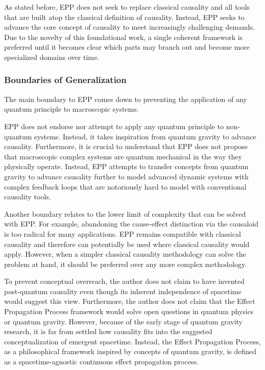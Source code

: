 As stated before, EPP does not seek to replace classical causality and all tools that are built atop the classical
definition of causality. Instead, EPP seeks to advance the core concept of causality to meet increasingly challenging
demands. Due to the novelty of this foundational work, a single coherent framework is preferred until it becomes clear
which parts may branch out and become more specialized domains over time.

\newpage

\subsubsection{Boundaries of Generalization}

The main boundary to EPP comes down to preventing the application of any quantum principle to macroscopic systems.

EPP does not endorse nor attempt to apply any quantum principle to non-quantum systems. Instead, it takes inspiration from quantum gravity to advance causality. Furthermore, it is crucial to understand that EPP does not propose that macroscopic complex systems are quantum mechanical in the way they physically operate. Instead, EPP attempts to transfer concepts from quantum gravity to advance causality further to model advanced dynamic systems with complex feedback loops that are notoriously hard to model with conventional causality tools.

Another boundary relates to the lower limit of complexity that can be solved with EPP. For example, abandoning the cause-effect distinction via the causaloid is too radical for many applications. EPP remains compatible with classical causality and therefore can potentially be used where classical causality would apply. However, when a simpler classical causality methodology can solve the problem at hand, it should be preferred over any more complex methodology.

To prevent conceptual overreach, the author does not claim to have invented post-quantum causality even though its inherent independence of spacetime would suggest this view. Furthermore, the author does not claim that the Effect Propagation Process framework would solve open questions in quantum physics or quantum gravity. However, because of the early stage of quantum gravity research, it is far from settled how causality fits into the suggested conceptualization of emergent spacetime. Instead, the Effect Propagation Process, as a philosophical framework inspired by concepts of quantum gravity, is defined as a spacetime-agnostic continuous effect propagation process.

